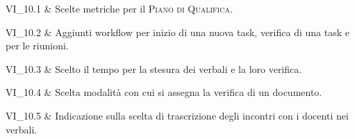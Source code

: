 VI\_10.1 & Scelte metriche per il \textsc{Piano di Qualifica}.

\tabularnewline
VI\_10.2 & Aggiunti workflow per inizio di una nuova task, verifica di una task e per le riunioni.

\tabularnewline
VI\_10.3 & Scelto il tempo per la stesura dei verbali e la loro verifica.

\tabularnewline
VI\_10.4 & Scelta modalità con cui si assegna la verifica di un documento.

\tabularnewline
VI\_10.5 & Indicazione sulla scelta di trascrizione degli incontri con i docenti nei verbali.

